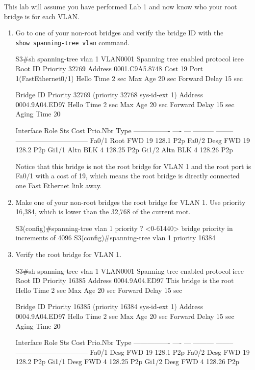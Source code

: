 This lab will assume you have performed Lab 1 and now know who your root
bridge is for each VLAN.

\begin{enumerate}
\item
  Go to one of your
  non-root bridges and verify the bridge ID with the
  \texttt{show\ spanning-tree\ vlan} command.

\begin{cli}
S3#sh spanning-tree vlan 1
VLAN0001
  Spanning tree enabled protocol ieee
  Root ID    Priority    32769
             Address     0001.C9A5.8748
             Cost        19
             Port        1(FastEthernet0/1)
             Hello Time  2 sec  Max Age 20 sec  Forward Delay 15 sec
 
  Bridge ID  Priority    32769  (priority 32768 sys-id-ext 1)
             Address     0004.9A04.ED97
             Hello Time  2 sec  Max Age 20 sec  Forward Delay 15 sec
             Aging Time  20
 
Interface        Role Sts Cost      Prio.Nbr Type
---------------- ---- --- --------- -------- --------------------------------
Fa0/1            Root FWD 19        128.1    P2p
Fa0/2            Desg FWD 19        128.2    P2p
Gi1/1            Altn BLK 4         128.25   P2p
Gi1/2            Altn BLK 4         128.26   P2p
\end{cli}

  Notice that this bridge is not the root bridge for VLAN 1 and the root
  port is Fa0/1 with a cost of 19, which means the root bridge is
  directly connected one Fast Ethernet link away.
\item
  Make one of your non-root bridges the root bridge for VLAN 1. Use
  priority 16,384, which is lower than the 32,768 of the current root.

\begin{cli}
S3(config)#spanning-tree vlan 1 priority ?
  <0-61440>  bridge priority in increments of 4096
S3(config)#spanning-tree vlan 1 priority 16384
\end{cli}
\item
  Verify the root bridge for VLAN 1.

\begin{cli}
S3#sh spanning-tree vlan 1
VLAN0001
  Spanning tree enabled protocol ieee
  Root ID    Priority    16385
             Address     0004.9A04.ED97
             This bridge is the root
             Hello Time  2 sec  Max Age 20 sec  Forward Delay 15 sec
 
  Bridge ID  Priority    16385  (priority 16384 sys-id-ext 1)
             Address     0004.9A04.ED97
             Hello Time  2 sec  Max Age 20 sec  Forward Delay 15 sec
             Aging Time  20
 
Interface        Role Sts Cost      Prio.Nbr Type
---------------- ---- --- --------- -------- --------------------------------
Fa0/1            Desg FWD 19        128.1    P2p
Fa0/2            Desg FWD 19        128.2    P2p
Gi1/1            Desg FWD 4         128.25   P2p
Gi1/2            Desg FWD 4         128.26   P2p
\end{cli}
\end{enumerate}

